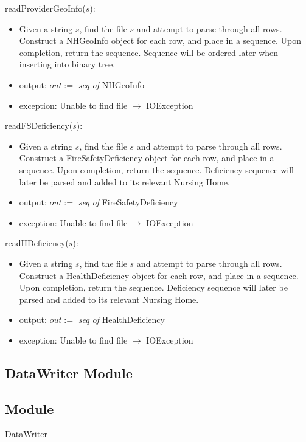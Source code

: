 \documentclass[12pt]{article}
\begin{document}
\noindent readProviderGeoInfo($s$):
\begin{itemize}
\item Given a string $s$, find the file $s$ and attempt to parse through all rows. Construct a NHGeoInfo object for each row, and place in a sequence. Upon completion, return the sequence. Sequence will be ordered later when inserting into binary tree.
\item output: $out :=$ \textit{seq of} NHGeoInfo
\item exception: Unable to find file $\rightarrow$ IOException
\end{itemize}

\noindent readFSDeficiency($s$):
\begin{itemize}
\item Given a string $s$, find the file $s$ and attempt to parse through all rows. Construct a FireSafetyDeficiency object for each row, and place in a sequence. Upon completion, return the sequence. Deficiency sequence will later be parsed and added to its relevant Nursing Home.
\item output: $out :=$ \textit{seq of} FireSafetyDeficiency
\item exception: Unable to find file $\rightarrow$ IOException
\end{itemize}

\noindent readHDeficiency($s$):
\begin{itemize}
\item Given a string $s$, find the file $s$ and attempt to parse through all rows. Construct a HealthDeficiency object for each row, and place in a sequence. Upon completion, return the sequence. Deficiency sequence will later be parsed and added to its relevant Nursing Home.
\item output: $out :=$ \textit{seq of} HealthDeficiency
\item exception: Unable to find file $\rightarrow$ IOException
\end{itemize}

\newpage

\subsection{DataWriter Module}

\subsection*{Module}
DataWriter
\end{document}
